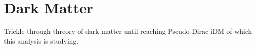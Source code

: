 \chapter{Dark Matter}
\label{chapter:dm}

Trickle through threory of dark matter until reaching Pseudo-Dirac iDM of which
this analysis is studying.


